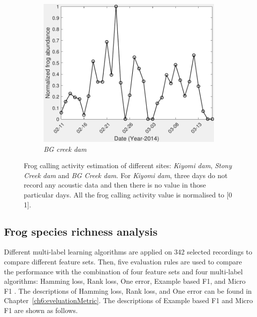 \begin{figure}[htb!]
               ~
              \begin{subfigure}[b]{0.3\textwidth}
                \includegraphics[width=\textwidth]{image/Ch7/abundance1079.pdf}     
                \caption{\textit{BG creek dam}}           
        \end{subfigure}       
\caption[Frog calling activity detection of different sites]{Frog calling activity estimation of different sites: \textit{Kiyomi dam}, \textit{Stony Creek dam} and \textit{BG Creek dam}. For \textit{Kiyomi dam}, three days do not record any acoustic data and then there is no value in those particular days. All the frog calling activity value is normalised to [0 1].}
        \label{fig:frogAbundance}
\end{figure}



\subsection{Frog species richness analysis}
Different multi-label learning algorithms are applied on 342 selected recordings to compare different feature sets. Then, five evaluation rules are used to compare the performance with the combination of four feature sets and four multi-label algorithms: Hamming loss, Rank loss, One error, Example based F1, and Micro F1 \citep{Madjarov20123084, ZhangReview2014}. The descriptions of Hamming loss, Rank loss, and One error can be found in Chapter~\ref{ch6:eveluationMetric}. The descriptions of Example based F1  and Micro F1 are shown as follows.



